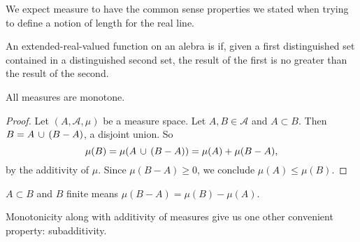 
\sbasic



























\sstart
{}


We expect measure to have the
common sense properties we stated
when trying to define a notion of
length for the real line.


An extended-real-valued function on an
alebra is
if, given a first distinguished set contained in
a distinguished second set, the result of the
first is no greater than the result of the second.

\begin{prop}
  All measures are monotone.
  \begin{proof}
    Let $(A, \mathcal{A}, \mu)$ be
    a measure space.
    Let $A, B \in \mathcal{A}$
    and $A \subset B$.
    Then $B = A \,\cup\, (B - A)$,
    a disjoint union.
    So
    \[
      \mu(B) = \mu(A \,\cup\, (B - A))= \mu(A) + \mu(B - A),
    \]
    by the additivity of $\mu$.
    Since $\mu(B - A) \geq 0$,
    we conclude $\mu(A) \leq \mu(B)$.
  \end{proof}
\end{prop}

\begin{prop}
  $A \subset B$ and $B$ finite
  means $\mu(B - A) = \mu(B) - \mu(A)$.
\end{prop}



Monotonicity along with additivity of
measures give us one other convenient
property: subadditivity.

